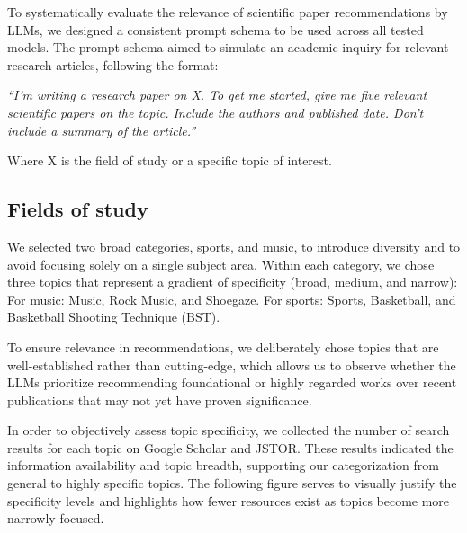 \documentclass[runningheads]{llncs}
\begin{document}
To systematically evaluate the relevance of scientific paper recommendations by LLMs, we designed a consistent prompt schema to be used across all tested models. The prompt schema aimed to simulate an academic inquiry for relevant research articles, following the format:

\textit{“I'm writing a research paper on X. To get me started, give me five relevant scientific papers on the topic. Include the authors and published date. Don't include a summary of the article.”}

Where X is the field of study or a specific topic of interest.

\subsection{Fields of study}

We selected two broad categories, sports, and music, to introduce diversity and to avoid focusing solely on a single subject area. Within each category, we chose three topics that represent a gradient of specificity (broad, medium, and narrow): For music: Music, Rock Music, and Shoegaze. For sports: Sports, Basketball, and Basketball Shooting Technique (BST).

To ensure relevance in recommendations, we deliberately chose topics that are well-established rather than cutting-edge, which allows us to observe whether the LLMs prioritize recommending foundational or highly regarded works over recent publications that may not yet have proven significance.

In order to objectively assess topic specificity, we collected the number of search results for each topic on Google Scholar and JSTOR. These results indicated the information availability and topic breadth, supporting our categorization from general to highly specific topics. The following figure serves to visually justify the specificity levels and highlights how fewer resources exist as topics become more narrowly focused.
\end{document}
